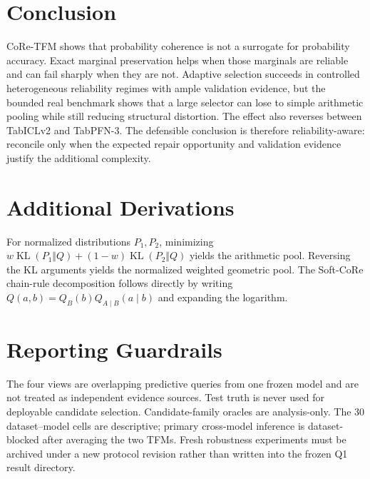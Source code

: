 \documentclass[twoside,11pt]{article}
\newcommand{\KL}{\operatorname{KL}}
\begin{document}
\section{Conclusion}
CoRe-TFM shows that probability coherence is not a surrogate for probability accuracy. Exact marginal preservation helps when those marginals are reliable and can fail sharply when they are not. Adaptive selection succeeds in controlled heterogeneous reliability regimes with ample validation evidence, but the bounded real benchmark shows that a large selector can lose to simple arithmetic pooling while still reducing structural distortion. The effect also reverses between TabICLv2 and TabPFN-3. The defensible conclusion is therefore reliability-aware: reconcile only when the expected repair opportunity and validation evidence justify the additional complexity.


\appendix
\section{Additional Derivations}
For normalized distributions $P_1,P_2$, minimizing $w\KL(P_1\Vert Q)+(1-w)\KL(P_2\Vert Q)$ yields the arithmetic pool. Reversing the KL arguments yields the normalized weighted geometric pool. The Soft-CoRe chain-rule decomposition follows directly by writing $Q(a,b)=Q_B(b)Q_{A\mid B}(a\mid b)$ and expanding the logarithm.

\section{Reporting Guardrails}
The four views are overlapping predictive queries from one frozen model and are not treated as independent evidence sources. Test truth is never used for deployable candidate selection. Candidate-family oracles are analysis-only. The 30 dataset--model cells are descriptive; primary cross-model inference is dataset-blocked after averaging the two TFMs. Fresh robustness experiments must be archived under a new protocol revision rather than written into the frozen Q1 result directory.


\end{document}

